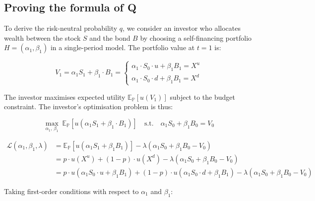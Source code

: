 \documentclass[hidelinks, 12pt, a4paper]{article}
\theoremstyle{definition}
\begin{document}
\subsection{Proving the formula of Q}

\noindent To derive the risk-neutral probability $q$, we consider an investor who allocates 
wealth between the stock $S$ and the bond $B$ by choosing a self-financing
portfolio $H = (\alpha_1, \beta_1)$ in a single-period model. The portfolio value at $t=1$ is:


\begin{equation}
V_1 = \alpha_1 S_1 + \beta_1 \cdot B_1 =
\left\{
\begin{array}{l}
\alpha_1 \cdot S_0 \cdot u + \beta_1 B_1 = X^u \\[4pt]
\alpha_1 \cdot S_0 \cdot d + \beta_1 B_1 = X^d
\end{array}
\right.
\end{equation}


\noindent The investor maximises expected utility $\mathbb{E}_{\mathbb{P}}[u(V_1)]$ subject to the budget 
constraint. The investor's optimisation problem is thus:

\begin{equation}
\max_{\alpha_1,\, \beta_1} \; 
\mathbb{E}_{\mathbb{P}}\left[u\!\left(\alpha_1 S_1 + \beta_1 \cdot B_1\right)\right]
\quad \text{s.t.} \quad
\alpha_1 S_0 + \beta_1 B_0 = V_0
\end{equation}




\begin{equation}
\begin{aligned}
\mathcal{L}(\alpha_1, \beta_1, \lambda)
  &= \mathbb{E}_{\mathbb{P}}\left[u\!\left(\alpha_1 S_1 + \beta_1 B_1\right)\right]
     - \lambda\!\left(\alpha_1 S_0 + \beta_1 B_0 - V_0\right) \\[6pt]
  &= p \cdot u(X^u) + (1-p) \cdot u(X^d)
     - \lambda\!\left(\alpha_1 S_0 + \beta_1 B_0 - V_0\right) \\[6pt]
  &= p \cdot u(\alpha_1 S_0 \cdot u + \beta_1 B_1)
     + (1-p) \cdot u(\alpha_1 S_0 \cdot d + \beta_1 B_1)
     - \lambda\!\left(\alpha_1 S_0 + \beta_1 B_0 - V_0\right)
\end{aligned}
\end{equation}


\noindent Taking first-order conditions with respect to $\alpha_1$ and $\beta_1$:
\end{document}
